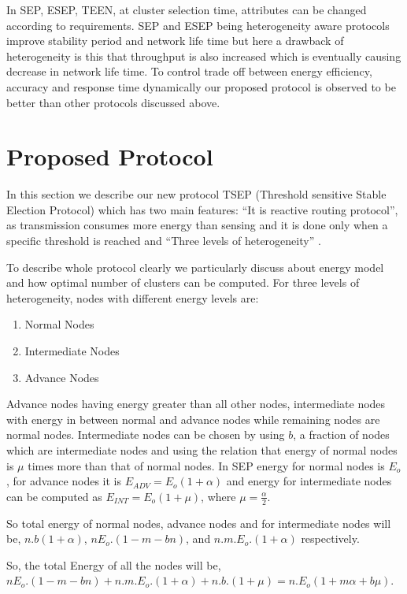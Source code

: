 \documentclass[conference]{IEEEtran}
\begin{document}
In SEP, ESEP, TEEN, at cluster selection time, attributes can be changed according to requirements. SEP and ESEP being heterogeneity aware protocols improve stability period and network life time but here a drawback of heterogeneity is this that throughput is also increased which is eventually causing decrease in network life time. To control trade off between energy efficiency, accuracy and response time dynamically our proposed protocol is observed to be better than other protocols discussed above.

\section{Proposed Protocol}
In this section we describe our new protocol TSEP (Threshold sensitive Stable Election Protocol) which has two main features: ``It is reactive routing protocol'', as transmission consumes more energy than sensing and it is done only when a specific threshold is reached and ``Three levels of heterogeneity'' .


To describe whole protocol clearly we particularly discuss about energy model and how optimal number of clusters can be computed.
For three levels of heterogeneity, nodes with different energy levels are:

\begin{enumerate}
  \item Normal Nodes
  \item Intermediate Nodes
  \item Advance Nodes\\
\end{enumerate}

Advance nodes having energy greater than all other nodes, intermediate nodes with energy in between normal and advance nodes while remaining nodes are normal nodes. Intermediate nodes can be chosen by using $b$, a fraction of nodes which are intermediate nodes and using the relation that energy of normal nodes is $\mu$ times more than that of normal nodes. In SEP energy for normal nodes is $ E_o$, for advance nodes it is $E_{ADV}=E_o(1+\alpha)$ and energy for intermediate nodes can be computed as $ E_{INT}= E_o(1+\mu)$, where $ \mu =\frac{\alpha}{2}$.

So total energy of normal nodes, advance nodes and for intermediate nodes will be, $n.b(1+{\alpha})$, $ nE_o.(1-m-bn)$, and $n.m.E_o.(1+\alpha)$ respectively.

So, the total Energy of all the nodes will be, $nE_o.(1-m-bn)+n.m.E_o.(1+ \alpha)+ n.b.(1+\mu)=n.E_o(1+ m\alpha + b\mu)$.
\end{document}
